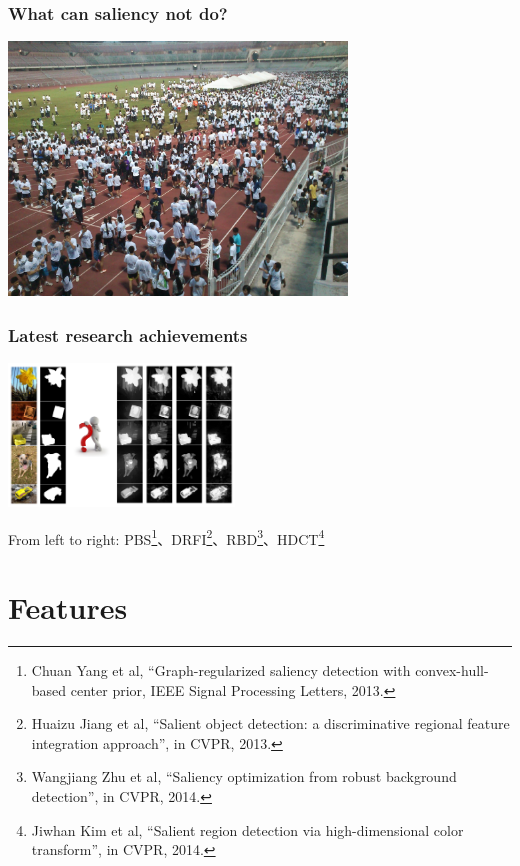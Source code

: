 \documentclass[notheorems,serif,table,compress]{beamer}  %
\begin{document}
\begin{frame}
\frametitle{What can saliency not do?}
\centering\includegraphics[width=9cm]{challenge.JPG}
\end{frame}


\begin{frame}
\frametitle{Latest research achievements}
\centering\includegraphics[width=6cm]{latest}

  From left to right: PBS\footnote{Chuan Yang et al, ``Graph-regularized saliency detection with convex-hull-based center prior, IEEE Signal Processing Letters, 2013.}、DRFI\footnote{Huaizu Jiang et al, ``Salient object detection: a discriminative regional feature integration approach'', in CVPR, 2013.}、RBD\footnote{Wangjiang Zhu et al, ``Saliency optimization from robust background detection'', in CVPR, 2014.}、HDCT\footnote{Jiwhan Kim et al, ``Salient region detection via high-dimensional color transform'', in CVPR, 2014.}
\end{frame}


\section{Features}
\end{document}
